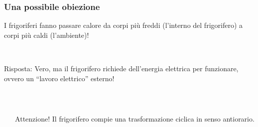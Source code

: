 \documentclass[]{beamer}
\theoremstyle{plain}
\begin{document}
\begin{frame}
\frametitle{Una possibile obiezione}
I frigoriferi fanno passare calore da corpi più freddi (l'interno del frigorifero) a corpi più caldi (l'ambiente)!\pause

~

Risposta: Vero, ma il frigorifero richiede dell'energia elettrica  per funzionare, ovvero un ``lavoro elettrico'' esterno!\pause

~

\begin{columns}
\begin{column}{.4\textwidth}
\end{column}
\begin{column}{.4\textwidth}
  \begin{alertblock}{Attenzione!}
    Il frigorifero compie una trasformazione ciclica in senso antiorario.
  \end{alertblock}
\end{column}
\end{columns}
\end{frame}
\end{document}
